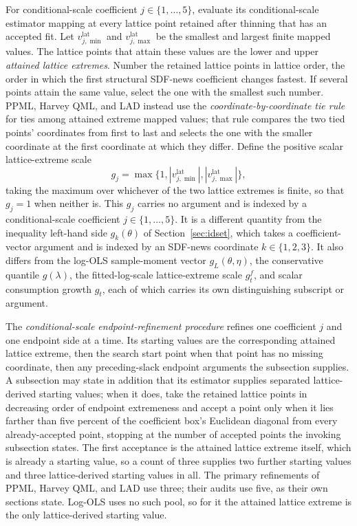 \documentclass[11pt]{article}
\begin{document}
For conditional-scale coefficient \(j\in\{1,\ldots,5\}\), evaluate its conditional-scale estimator mapping at every
lattice point retained after thinning that has an accepted fit. Let
\(v_{j,\min}^{\mathrm{lat}}\) and \(v_{j,\max}^{\mathrm{lat}}\) be the smallest and largest finite
mapped values. The lattice points that attain these values are the lower and upper
\emph{attained lattice extremes}. Number the retained lattice points in lattice order, the order in
which the first structural SDF-news coefficient changes fastest. If several points attain the same
value, select the one with the smallest such number. PPML, Harvey QML, and LAD instead use the
\emph{coordinate-by-coordinate tie rule} for ties among attained extreme mapped values; that rule
compares the two tied points'
coordinates from first to last and selects the one with the smaller coordinate at the first
coordinate at which they differ. Define the positive scalar lattice-extreme scale
\begin{equation*}
 g_j=\max\{1,|v_{j,\min}^{\mathrm{lat}}|,|v_{j,\max}^{\mathrm{lat}}|\},
\end{equation*}
taking the maximum over whichever of the two lattice extremes is finite, so that \(g_j=1\) when
neither is. This \(g_j\) carries no argument and is indexed by a conditional-scale coefficient
\(j\in\{1,\ldots,5\}\). It is a different quantity from the inequality left-hand side
\(g_k(\theta)\) of Section~\ref{sec:idset}, which takes a coefficient-vector argument and is indexed
by an SDF-news coordinate \(k\in\{1,2,3\}\). It also differs from the log-OLS sample-moment
vector \(g_L(\theta,\eta)\), the conservative quantile \(g(\lambda)\), the fitted-log-scale
lattice-extreme scale \(g_t^f\), and scalar consumption growth \(g_t\), each of which carries its
own distinguishing subscript or argument.

The \emph{conditional-scale endpoint-refinement procedure} refines one coefficient \(j\) and one
endpoint side at a time. Its starting values are the corresponding attained lattice extreme, then the
search start point when that point has no missing coordinate, then any preceding-slack endpoint arguments the
subsection supplies. A subsection may state in addition that its estimator supplies separated
lattice-derived starting values; when it does, take the retained lattice points in decreasing order
of endpoint extremeness and accept a point only when it lies farther than five percent of the
coefficient box's Euclidean diagonal from every already-accepted point, stopping at the number of
accepted points the invoking subsection states. The first acceptance is the attained lattice extreme
itself, which is already a starting value, so a count of three supplies two further starting values and three
lattice-derived starting values in all. The primary refinements of PPML, Harvey QML, and LAD use three; their
audits use five, as their own sections state. Log-OLS uses no such pool, so for it the attained lattice extreme is the only
lattice-derived starting value.
\end{document}
